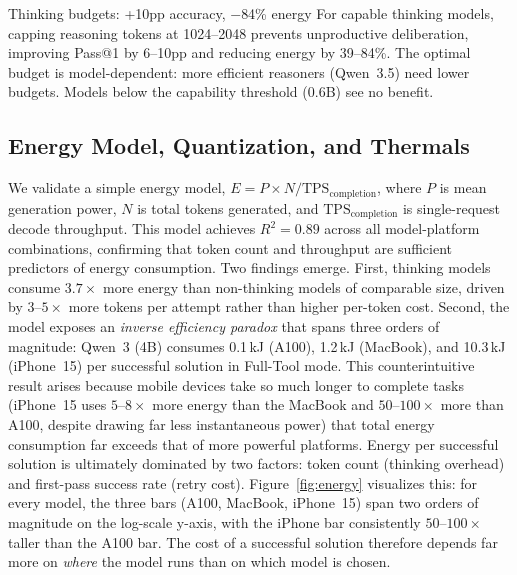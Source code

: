 \documentclass[sigconf,anonymous,review]{acmart}
\begin{document}
\begin{insightbox}{Thinking budgets: +10pp accuracy, $-$84\% energy}
For capable thinking models, capping reasoning tokens at 1024--2048 prevents unproductive deliberation, improving Pass@1 by 6--10pp and reducing energy by 39--84\%.
The optimal budget is model-dependent: more efficient reasoners (Qwen~3.5) need lower budgets.
Models below the capability threshold (0.6B) see no benefit.
\end{insightbox}

\subsection{Energy Model, Quantization, and Thermals}
\label{sec:costmodel}
\label{sec:quantization}

We validate a simple energy model, $E = P \times N / \text{TPS}_{\text{completion}}$, where $P$ is mean generation power, $N$ is total tokens generated, and $\text{TPS}_{\text{completion}}$ is single-request decode throughput. This model achieves $R^2=0.89$ across all model-platform combinations, confirming that token count and throughput are sufficient predictors of energy consumption. Two findings emerge. First, thinking models consume $3.7\times$ more energy than non-thinking models of comparable size, driven by $3$--$5\times$ more tokens per attempt rather than higher per-token cost. Second, the model exposes an \emph{inverse efficiency paradox} that spans three orders of magnitude: Qwen~3 (4B) consumes 0.1\,kJ (A100), 1.2\,kJ (MacBook), and 10.3\,kJ (iPhone~15) per successful solution in Full-Tool mode. This counterintuitive result arises because mobile devices take so much longer to complete tasks (iPhone~15 uses $5$--$8\times$ more energy than the MacBook and $50$--$100\times$ more than A100, despite drawing far less instantaneous power) that total energy consumption far exceeds that of more powerful platforms. Energy per successful solution is ultimately dominated by two factors: token count (thinking overhead) and first-pass success rate (retry cost). Figure~\ref{fig:energy} visualizes this: for every model, the three bars (A100, MacBook, iPhone~15) span two orders of magnitude on the log-scale y-axis, with the iPhone bar consistently $50$--$100\times$ taller than the A100 bar. The cost of a successful solution therefore depends far more on \emph{where} the model runs than on which model is chosen.
\end{document}
